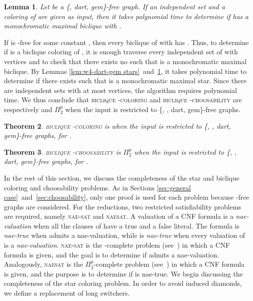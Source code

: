 \documentclass[a4paper, 11pt, oneside]{article}
\newtheorem{theorem}{Theorem}
\newtheorem{lemma}[theorem]{Lemma}
\newcommand{\bccol}[1]{\textsc{biclique -coloring}}
\newcommand{\bcchose}[1]{\textsc{biclique -choosability}}
\newcommand{\ptwop}{\ensuremath{\Pi^p_2}\xspace}
\newcommand{\naesat}{\textsc{nae-sat}\xspace}
\newcommand{\naesatt}{\textsc{naesat}\xspace}
\let\Definition=\emph
\begin{document}
\begin{lemma}\label{lem:w4-dart-gem bicliques}
 Let  be a \{, dart, gem\}-free graph.  If an independent set  and a coloring  of  are given as input, then it takes polynomial time to determine if  has a monochromatic maximal biclique  with .
\end{lemma}

If  is -free for some constant , then every biclique  of  with  has .  Thus, to determine if  is a biclique coloring of , it is enough traverse every independent set  of  with  vertices and to check that there exists no  such that  is a monochromatic maximal biclique.  By Lemmas \ref{lem:w4-dart-gem stars}~and~\ref{lem:w4-dart-gem bicliques}, it takes polynomial time to determine if there exists  such that  is a monochromatic maximal star.  Since there are  independent sets with at most  vertices, the algorithm requires polynomial time.  We thus conclude that \bccol{k} and \bcchose{k} are respectively \NP and \ptwop when the input is restricted to \{, , dart, gem\}-free graphs.

\begin{theorem}\label{thm:np w4-dart-gem-kii}
 \bccol{k} is \NP when the input is restricted to \{, , dart, gem\}-free graphs, for .
\end{theorem}

\begin{theorem}
 \bcchose{k} is \ptwop when the input is restricted to \{, , dart, gem\}-free graphs, for .
\end{theorem}

In the rest of this section, we discuss the completeness of the star and biclique coloring and choosability problems.  As in Sections \ref{sec:general case}~and~\ref{sec:choosability}, only one proof is used for each problem because -free graphs are considered.  For the reductions, two restricted satisfiability problems are required, namely \naesat and \naesatt.  A valuation  of a CNF formula  is a \Definition{nae-valuation} when all the clauses of  have a true and a false literal.  The formula  is \Definition{nae-true} when  admits a nae-valuation, while  is \Definition{nae-true} when every valuation of  is a \Definition{nae-valuation}.   \naesat is the \NP-complete problem (see~\cite{Garey1979}) in which a CNF formula  is given, and the goal is to determine if  admits a nae-valuation.  Analogously, \naesatt is the \ptwop-complete problem (see~\cite{EiterGottlob1995}) in which a CNF formula  is given, and the purpose is to determine if  is nae-true.  We begin discussing the completeness of the star coloring problem.  In order to avoid induced diamonds, we define a replacement of long switchers.
\end{document}
